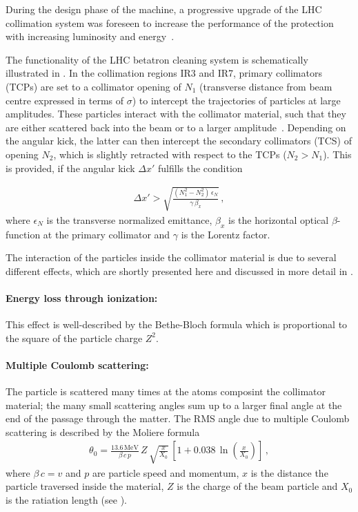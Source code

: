 During the design phase of the machine, a progressive upgrade of the LHC collimation system was foreseen to increase the performance of the protection with increasing luminosity and energy~\citedr. 


 



The functionality of the LHC betatron cleaning system is schematically illustrated in . In the collimation regions IR3 and IR7, primary collimators (TCPs) are set to a collimator opening of $N_1$ (transverse distance from beam centre expressed in terms of $\sigma$) to intercept the trajectories of particles at large amplitudes. These particles interact with the collimator material, such that they are either scattered back into the beam or to a larger amplitude~\citedr. Depending on the angular kick, the latter can then intercept the secondary collimators (TCS) of opening $N_2$, which is slightly retracted with respect to the TCPs ($N_2>N_1$). This is provided, if the angular kick $\Delta x'$ fulfills the condition~\cite{jeanneret1998optics}

\begin{align}
\Delta x' > \sqrt{\frac{(N_1^2 - N_2^2) \, \epsilon_N }{ \gamma \, \beta_x } } \,,
\end{align}
where $\epsilon_N$ is the transverse normalized emittance, $\beta_x$ is the horizontal optical $\beta$-function at the primary collimator and $\gamma$ is the Lorentz factor.

The interaction of the particles inside the collimator material is due to several different effects, which are shortly presented here and discussed in more detail in .
\paragraph{Energy loss through ionization:} This effect is well-described by the Bethe-Bloch formula which is proportional to the square of the particle charge $Z^2$. 

\paragraph{Multiple Coulomb scattering:} The particle is scattered many times at the atoms composint the collimator material; the many small scattering angles sum up to a larger final angle at the end of the passage through the matter. The RMS angle due to multiple Coulomb scattering is described by the Moliere formula~\cite{Beringer:1900zz}
\begin{align}
\theta_0 = \frac{13.6\,\text{MeV}}{\beta \, c \, p} \, Z \, \sqrt{\frac{x}{X_0}} \, \left[ 1 + 0.038 \, \ln \left( \frac{x}{X_0} \right) \right] \, ,
\end{align}
where $\beta\,c = v$ and $p$ are particle speed and momentum, $x$ is the distance the particle traversed inside the material, $Z$ is the charge of the beam particle and $X_0$ is the ratiation length (see ).


